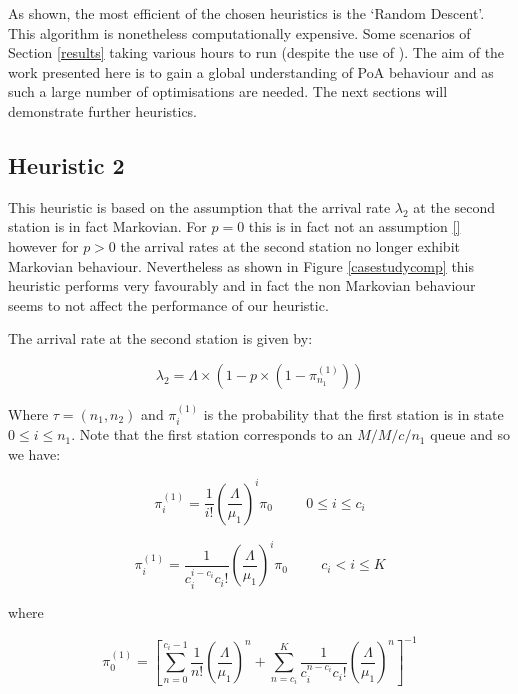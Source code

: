 \documentclass[12pt]{article}
\begin{document}
As shown, the most efficient of the chosen heuristics is the `Random Descent'.
This algorithm is nonetheless computationally expensive.
Some scenarios of Section \ref{results} taking various hours to run (despite the use of \cite{web002}).
The aim of the work presented here is to gain a global understanding of PoA behaviour and as such a large number of optimisations are needed.
The next sections will demonstrate further heuristics.

\subsection{Heuristic 2}\label{heuristic2}

This heuristic is based on the assumption that the arrival rate $\lambda_2$ at the second station is in fact Markovian.
For $p=0$ this is in fact not an assumption \ref{} however for $p>0$ the arrival rates at the second station no longer exhibit Markovian behaviour.
Nevertheless as shown in Figure \ref{casestudycomp} this heuristic performs very favourably and in fact the non Markovian behaviour seems to not affect the performance of our heuristic.

The arrival rate at the second station is given by:

\begin{equation}
\lambda_2 = \Lambda\times(1-p\times(1-\pi^{(1)}_{n_1}))
\end{equation}

Where $\tau=(n_1, n_2)$ and $\pi^{(1)}_{i}$ is the probability that the first station is in state $0\leq i\leq n_1$.
Note that the first station corresponds to an $M/M/c/n_1$ queue and so we have:

\begin{equation}\label{eq:probcl}
  \pi^{(1)}_i = \frac{1}{i!}\left(\frac{\Lambda}{\mu_1}\right)^{i}\pi_{0} \hspace{1cm} 0\leq i \leq c_i
\end{equation}

\begin{equation}\label{eq:probc_im}
  \pi^{(1)}_i = \frac{1}{c_i^{i-c_i}c_i!}\left(\frac{\Lambda}{\mu_1}\right)^{i}\pi_{0} \hspace{1cm} c_i< i \leq K
\end{equation}

where

\begin{equation}
\pi^{(1)}_{0} = \left[ \sum_{n=0}^{c_i-1} \frac{1}{n!} \left( \frac{\Lambda}{\mu_1} \right)^{n}  + \sum_{n=c_i}^{K} \frac{1}{c_i^{n-c_i}c_i!} \left( \frac{\Lambda}{\mu_1} \right)^{n} \right] ^{-1}
\end{equation}
\end{document}
